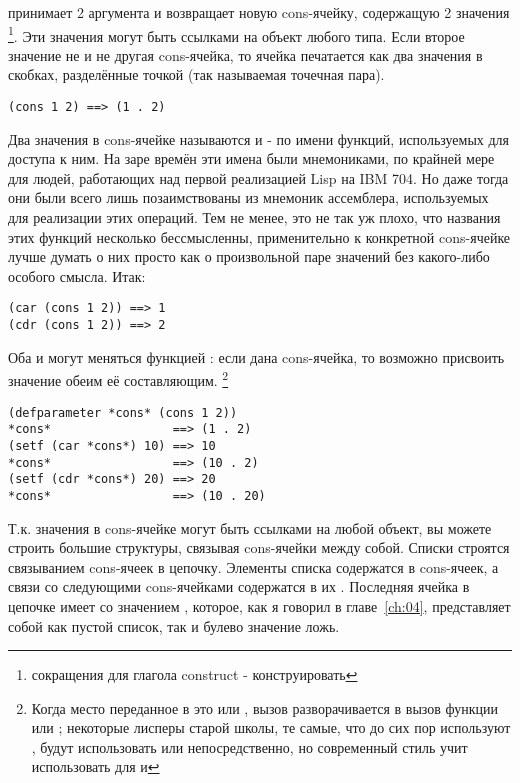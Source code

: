  принимает 2 аргумента и возвращает новую cons-ячейку, содержащую 2 значения
\footnote{ сокращения для глагола construct - конструировать}. Эти значения
могут быть ссылками на объект любого типа. Если второе значение не  и не другая
cons-ячейка, то ячейка печатается как два значения в скобках, разделённые точкой (так
называемая точечная пара).

\begin{lstlisting}
(cons 1 2) ==> (1 . 2)
\end{lstlisting}

Два значения в cons-ячейке называются  и  - по имени функций,
используемых для доступа к ним. На заре времён эти имена были мнемониками, по крайней мере
для людей, работающих над первой реализацией Lisp на IBM 704. Но даже тогда они были всего
лишь позаимствованы из мнемоник ассемблера, используемых для реализации этих операций. Тем
не менее, это не так уж плохо, что названия этих функций несколько бессмысленны,
применительно к конкретной cons-ячейке лучше думать о них просто как о произвольной паре
значений без какого-либо особого смысла. Итак:

\begin{lstlisting}
(car (cons 1 2)) ==> 1
(cdr (cons 1 2)) ==> 2
\end{lstlisting}

Оба  и  могут меняться функцией : если дана cons-ячейка, то
возможно присвоить значение обеим её составляющим. \footnote{Когда место переданное в
   это  или , вызов  разворачивается в вызов
  функции  или ; некоторые лисперы старой школы, те самые, что
  до сих пор используют , будут использовать  или 
  непосредственно, но современный стиль учит использовать  для  и
  }

\begin{lstlisting}
(defparameter *cons* (cons 1 2))
*cons*                 ==> (1 . 2)
(setf (car *cons*) 10) ==> 10
*cons*                 ==> (10 . 2)
(setf (cdr *cons*) 20) ==> 20
*cons*                 ==> (10 . 20)
\end{lstlisting}

Т.к. значения в cons-ячейке могут быть ссылками на любой объект, вы можете строить большие
структуры, связывая cons-ячейки между собой. Списки строятся связыванием cons-ячеек в
цепочку. Элементы списка содержатся в  cons-ячеек, а связи со следующими
cons-ячейками содержатся в их . Последняя ячейка в цепочке имеет  со
значением , которое, как я говорил в главе~\ref{ch:04}, представляет собой как
пустой список, так и булево значение ложь.

